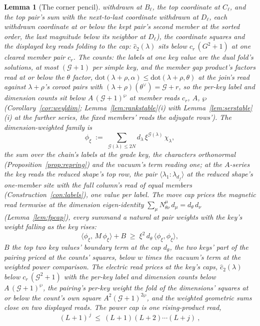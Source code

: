 \documentclass[11pt]{article}
\newtheorem{lemma}{Lemma}
\theoremstyle{definition}
\begin{document}
\begin{lemma}[The corner pencil]
withdrawn at $B_\ell$, the top coordinate at $C_\ell$, and the
top pair's sum with the next-to-last coordinate withdrawn at
$D_\ell$, each withdrawn coordinate at or below the kept pair's
second member at the sorted order, the last magnitude below its
neighbor at $D_\ell$), the coordinate
squares and the displayed key reads folding to the cap: $\hat
c_2(\lambda)$ sits below $c_r\,(G^2+1)$ at one cleared member
pair $c_r$. \emph{The counts}: the labels at one
key value are the dual fold's solutions, at most $(\mathcal G+1)$ per
simple key, and the member gap product's factors read at or
below the $\theta$ factor,
$\mathrm{dot}(\lambda{+}\rho,\alpha)\le
\mathrm{dot}(\lambda{+}\rho,\theta)$ at the join's read against
$\lambda{+}\rho$'s coroot pairs with
$(\lambda{+}\rho)(\theta^\vee)=\mathcal G+r$, so the per-key label and
dimension counts sit below $A\,(\mathcal G+1)^{\wp}$ at member reads
$c_r$, $A$, $\wp$ (Corollary~\ref{cor:weyldim};
Lemma~\ref{lem:rankstable}(i) with
Lemma~\ref{lem:serstable}(i) at the further series, the fixed
members' reads the adjugate rows'). The \emph{dimension-weighted
family} is
\[
\phi_\xi\;:=\;\sum_{\mathcal G(\lambda)\le 2N} d_\lambda\,
\xi^{\mathcal G(\lambda)}\,\chi_\lambda ,
\]
the sum over the chain's labels at the grade key, the characters
orthonormal (Proposition~\ref{prop:repring}) and the vacuum's
term reading one; at the $A$-series the key reads the reduced
shape's top row, the pair
$\langle\lambda_1\!:\!\lambda_{d_f}\rangle$ at the reduced
shape's one-member site with the full column's read of equal
members (Construction~\ref{con:labels}), one value per label.
The move cap prices the magnetic read termwise at the dimension
eigen-identity
$\sum_\mu N^\mu_{\theta\nu}\,d_\mu=d_\theta\,d_\nu$
(Lemma~\ref{lem:fpcap}), every summand a natural at pair weights
with the key's weight falling as the key rises:
\[
\langle\phi_\xi,\,M\,\phi_\xi\rangle+B
\;\ge\;\xi^{2}\,d_\theta\,\langle\phi_\xi,\phi_\xi\rangle ,
\]
$B$ the top two key values' boundary term at the cap $d_\theta$,
the two keys' part of the pairing priced at the counts' squares,
below $w$ times the vacuum's term at the weighted power
comparison. The
electric read prices at the key's caps, $\hat c_2(\lambda)$
below $c_r\,(\mathcal G^2+1)$ with the per-key label and dimension
counts below $A\,(\mathcal G+1)^{\wp}$, the pairing's per-key weight the
fold of the dimensions' squares at or below the count's own square
$A^2(\mathcal G+1)^{2\wp}$, and the weighted geometric sums
close on two displayed reads. The power cap is one rising-product
read,
\[
(L+1)^{\,j}\ \le\ (L+1)(L+2)\cdots(L+j)\ ,
\]
\end{lemma}
\end{document}
